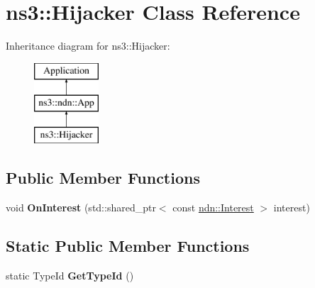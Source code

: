 \hypertarget{classns3_1_1Hijacker}{}\section{ns3\+:\+:Hijacker Class Reference}
\label{classns3_1_1Hijacker}
Inheritance diagram for ns3\+:\+:Hijacker\+:\begin{figure}[H]
\begin{center}
\leavevmode
\includegraphics[height=3.000000cm]{classns3_1_1Hijacker}
\end{center}
\end{figure}
\subsection*{Public Member Functions}
\begin{DoxyCompactItemize}
\item 
void {\bfseries On\+Interest} (std\+::shared\+\_\+ptr$<$ const \hyperlink{classndn_1_1Interest}{ndn\+::\+Interest} $>$ interest)\hypertarget{classns3_1_1Hijacker_a0418fb81fcbc9742a009eb2b864a9311}{}\label{classns3_1_1Hijacker_a0418fb81fcbc9742a009eb2b864a9311}

\end{DoxyCompactItemize}
\subsection*{Static Public Member Functions}
\begin{DoxyCompactItemize}
\item 
static Type\+Id {\bfseries Get\+Type\+Id} ()\hypertarget{classns3_1_1Hijacker_ab40989400950b1192b095368e4d7ceca}{}\label{classns3_1_1Hijacker_ab40989400950b1192b095368e4d7ceca}

\end{DoxyCompactItemize}
